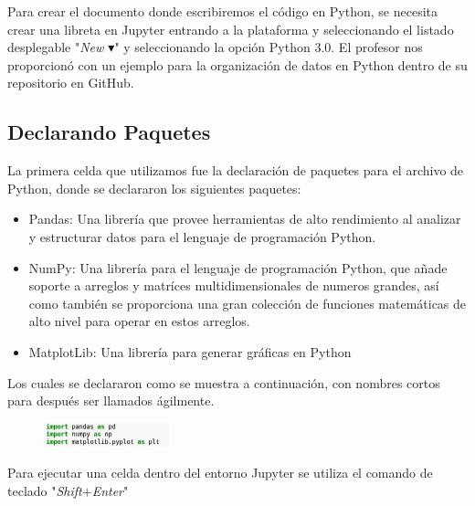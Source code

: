 \documentclass{article}
\begin{document}
Para crear el documento donde escribiremos el código en Python, se necesita crear una libreta en Jupyter entrando a la plataforma y seleccionando el listado desplegable "\textit{New $\blacktriangledown$}" y seleccionando la opción Python 3.0. El profesor nos proporcionó con un ejemplo para la organización de datos en Python dentro de su repositorio en GitHub.

\subsection{Declarando Paquetes}

La primera celda que utilizamos fue la declaración de paquetes para el archivo de Python, donde se declararon los siguientes paquetes:
\begin{itemize}
\item Pandas: Una librería que provee herramientas de alto rendimiento al analizar y estructurar datos para el lenguaje de programación Python.
\item NumPy: Una librería para el lenguaje de programación Python, que añade soporte a arreglos y matríces multidimensionales de numeros grandes, así como también se proporciona una gran colección de funciones matemáticas de alto nivel para operar en estos arreglos.
\item MatplotLib: Una librería para generar gráficas en Python
\end{itemize}

Los cuales se declararon como se muestra a continuación, con nombres cortos para después ser llamados ágilmente.
\begin{figure}[h]
\centering
\includegraphics[height=27px,width=137px]{1stcell.png}
\end{figure}

Para ejecutar una celda dentro del entorno Jupyter se utiliza el comando de teclado "\textit{Shift$+$Enter}"


\newpage
\end{document}
